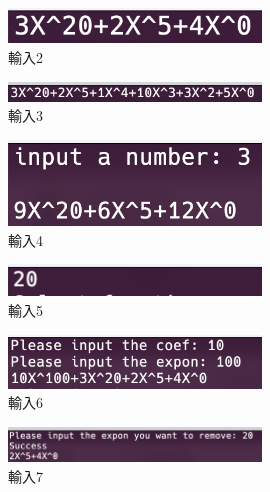 \documentclass[12pt, a4paper]{article}
\begin{document}
        \begin{figure}
          \centering
          \includegraphics[width=0.6\textwidth]{./image/Show.png}
          \caption{輸入2}
        \end{figure}

        \begin{figure}
          \centering
          \includegraphics[width=0.6\textwidth]{./image/Add.png}
          \caption{輸入3}
        \end{figure}

        
        \begin{figure}
          \centering
          \includegraphics[width=0.6\textwidth]{./image/SingleMult.png}
          \caption{輸入4}
        \end{figure}

        \begin{figure}
          \centering
          \includegraphics[width=0.6\textwidth]{./image/LeadExp.png}
          \caption{輸入5}
        \end{figure}

        \begin{figure}
          \centering
          \includegraphics[width=0.6\textwidth]{./image/Attach.png}
          \caption{輸入6}
        \end{figure}
          
        \begin{figure}
          \centering
          \includegraphics[width=0.6\textwidth]{./image/Remove.png}
          \caption{輸入7}
        \end{figure}
\end{document}
